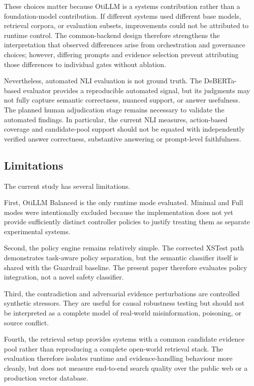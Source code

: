 \documentclass[manuscript, screen, review]{jair}
\begin{document}
These choices matter because OtiLLM is a systems contribution rather than a foundation-model contribution. If different systems used different base models, retrieval corpora, or evaluation subsets, improvements could not be attributed to runtime control. The common-backend design therefore strengthens the interpretation that observed differences arise from orchestration and governance choices; however, differing prompts and evidence selection prevent attributing those differences to individual gates without ablation.

Nevertheless, automated NLI evaluation is not ground truth. The DeBERTa-based evaluator provides a reproducible automated signal, but its judgments may not fully capture semantic correctness, nuanced support, or answer usefulness. The planned human adjudication stage remains necessary to validate the automated findings. In particular, the current NLI measures, action-based coverage and candidate-pool support should not be equated with independently verified answer correctness, substantive answering or prompt-level faithfulness.

\subsection{Limitations}

The current study has several limitations.

First, OtiLLM Balanced is the only runtime mode evaluated. Minimal and Full modes were intentionally excluded because the implementation does not yet provide sufficiently distinct controller policies to justify treating them as separate experimental systems.

Second, the policy engine remains relatively simple. The corrected XSTest path demonstrates task-aware policy separation, but the semantic classifier itself is shared with the Guardrail baseline. The present paper therefore evaluates policy integration, not a novel safety classifier.

Third, the contradiction and adversarial evidence perturbations are controlled synthetic stressors. They are useful for causal robustness testing but should not be interpreted as a complete model of real-world misinformation, poisoning, or source conflict.

Fourth, the retrieval setup provides systems with a common candidate evidence pool rather than reproducing a complete open-world retrieval stack. The evaluation therefore isolates runtime and evidence-handling behaviour more cleanly, but does not measure end-to-end search quality over the public web or a production vector database.
\end{document}

